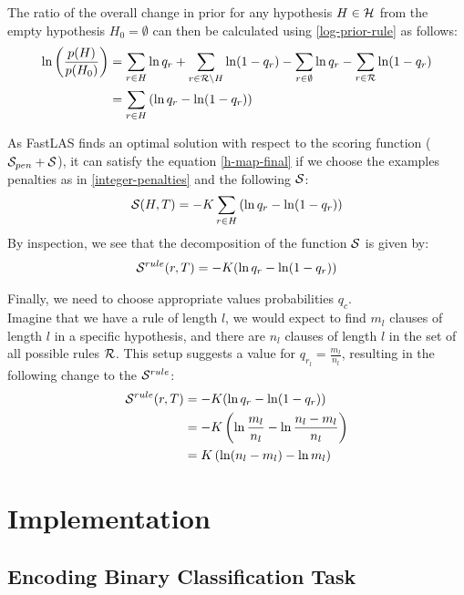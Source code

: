 The ratio of the overall change in prior for any hypothesis $H \in \mathcal{H}$ from the empty hypothesis $H_0 = \emptyset$ can then be calculated using \ref{log-prior-rule} as follows:
\begin{align}
\ln \left(\frac{p(H)}{p(H_0)}\right) 
& = \sum_{r \in H} \ln q_r + \sum_{r \in \mathcal{R}\setminus H} \ln(1-q_r) \nonumber
- \sum_{r \in \emptyset} \ln q_r - \sum_{r \in \mathcal{R}} \ln(1-q_r) \\
& = \sum_{r \in H} \left(\ln q_r - \ln(1-q_r) \right)
\end{align}

As FastLAS finds an optimal solution with respect to the scoring function ($\mathcal{S}_{pen} + \mathcal{S}$), it can satisfy the equation \ref{h-map-final} if we choose the examples penalties as in \ref{integer-penalties} and the following $\mathcal{S}$:
\begin{align}
    \mathcal{S}(H, T) =  -K \sum_{r \in H} \left(\ln q_r - \ln(1-q_r) \right)
\end{align}
By inspection, we see that the decomposition of the function $\mathcal{S}$ is given by:
\begin{align}
    \mathcal{S}^{rule}(r, T) = -K (\ln q_r - \ln(1-q_r))
\end{align}


Finally, we need to choose appropriate values probabilities $q_c$. \\
Imagine that we have a rule of length $l$, we would expect to find $m_l$ clauses of length $l$ in a specific hypothesis, and there are $n_l$ clauses of length $l$ in the set of all possible rules $\mathcal{R}$. 
This setup suggests a value for $q_{r_l} = \frac{m_l}{n_l}$, resulting in the following change to the $\mathcal{S}^{rule}$:
\begin{align}
\mathcal{S}^{rule}(r, T) 
& = -K (\ln q_r - \ln(1-q_r)) \nonumber \\
& = -K \left (\ln \frac{m_l}{n_l} - \ln \frac{n_l - m_l}{n_l} \right) \nonumber \\
& = K \left (\ln (n_l - m_l) - \ln m_l  \right)
\end{align}

\section{Implementation}

\subsection{Encoding Binary Classification Task}
\label{encoding-binary-classification-task}

